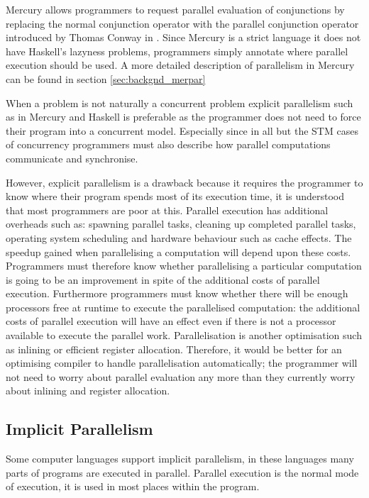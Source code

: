 \label{ref:parallel_conjunction}
Mercury allows programmers to request parallel evaluation of
conjunctions by replacing the normal conjunction operator with the
parallel conjunction operator introduced by Thomas Conway in
\citep{conway:2002:par,wang:2006:hons,wang:2011:dep-par}.
Since Mercury is a strict language it does not have Haskell's
lazyness problems,
programmers simply annotate where parallel execution
should be used.
A more detailed description of parallelism in Mercury can be found in
section \ref{sec:backgnd_merpar}

When a problem is not naturally a concurrent problem 
explicit parallelism such as in Mercury and Haskell
is preferable as the programmer does not need to force their program
into a concurrent model.
Especially since in all but the STM cases of concurrency programmers
must also describe how parallel computations communicate and
synchronise.

However, explicit parallelism is a drawback because it requires the
programmer to know where their program spends most of its execution
time, it is understood that most programmers are poor at this.
Parallel execution has additional overheads such as:
spawning parallel tasks,
cleaning up completed parallel tasks,
operating system scheduling and
hardware behaviour such as cache effects.
The speedup gained when parallelising a computation will depend upon
these costs.
Programmers must therefore know whether parallelising a particular
computation is going to be an improvement in spite of the additional
costs of parallel execution.
Furthermore programmers must know whether there will be enough
processors free at runtime to execute the parallelised computation:
the additional costs of parallel execution will have an effect even
if there is not a processor available to execute the parallel work.
Parallelisation is another optimisation such as inlining or efficient
register allocation.
Therefore,
it would be better for an optimising compiler to handle parallelisation
automatically;
the programmer will not need to worry about parallel evaluation any more
than they currently worry about inlining and register allocation.

\subsection{Implicit Parallelism}
\label{sec:lit_implicit-parallelism}

Some computer languages support implicit parallelism,
in these languages many parts of programs are executed in parallel.
Parallel execution is the normal mode of execution,
it is used in most places within the program.

